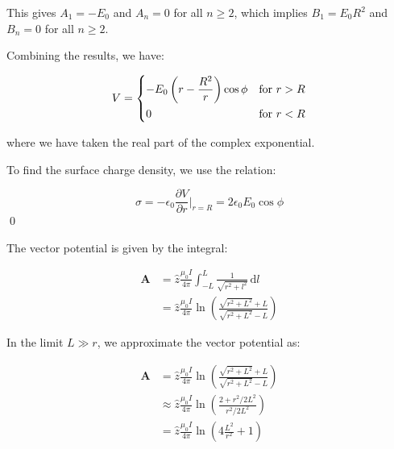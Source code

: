 \documentclass[12pt]{article}
\begin{document}
This gives $A_{1} = -E_{0}$ and $A_{n} = 0$ for all $n \ge 2$, which implies $B_{1} = E_{0} R^{2}$ and $B_{n} = 0$ for all $n \ge 2$.

Combining the results, we have:

\begin{equation}
V =
\begin{dcases}
    -E_{0} \left( r - \frac{R^{2}}{r} \right) \cos{\phi} & \text{for } r > R \\
    0 & \text{for } r < R
\end{dcases}
\end{equation}

where we have taken the real part of the complex exponential.

To find the surface charge density, we use the relation:

\begin{equation}
    \sigma = -\epsilon_{0} \frac{\partial V}{\partial r} \bigg\rvert_{r = R} = 2\epsilon_{0} E_{0} \cos{\phi}
\end{equation}
\qed



The vector potential is given by the integral:

\begin{equation}
\begin{split}
    \mathbf{A} &= \hat{z} \frac{\mu_{0} I}{4\pi} \int_{-L}^{L} \frac{1}{\sqrt{r^{2} + {l^{2}}}} \, \mathrm{d}l \\
    &= \hat{z} \frac{\mu_{0} I}{4\pi} \ln{\left( \frac{\sqrt{r^{2} + L^{2}} + L}{\sqrt{r^{2} + L^{2}} - L} \right)}
\end{split}
\end{equation}

In the limit $L \gg r$, we approximate the vector potential as:

\begin{equation}
\begin{split}
    \mathbf{A} &= \hat{z} \frac{\mu_{0} I}{4\pi} \ln{\left( \frac{\sqrt{r^{2} + L^{2}} + L}{\sqrt{r^{2} + L^{2}} - L} \right)} \\
    &\approx \hat{z} \frac{\mu_{0} I}{4\pi} \ln{\left( \frac{2 + r^{2}/2L^{2}}{r^{2}/2L^{2}} \right)} \\
    &= \hat{z} \frac{\mu_{0} I}{4\pi} \ln{\left( 4\frac{L^{2}}{r^{2}} + 1 \right)}
\end{split}
\end{equation}
\end{document}
